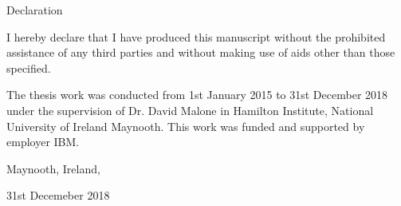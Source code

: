 


\thispagestyle{empty}
\vspace*{1.5cm}
\begin{center}
{\Large Declaration}
\end{center}

I hereby declare that I have produced this manuscript without the prohibited assistance of any third parties
and without making use of aids other than those specified. 

The thesis work was conducted from 1st January 2015 to 31st December 2018 under the supervision of Dr. David Malone
in Hamilton Institute, National University of Ireland Maynooth. This work was funded and supported by employer IBM.

\vspace{10mm}

\begin{flushright}
Maynooth, Ireland,

31st Decemeber 2018
\end{flushright}
\newpage


